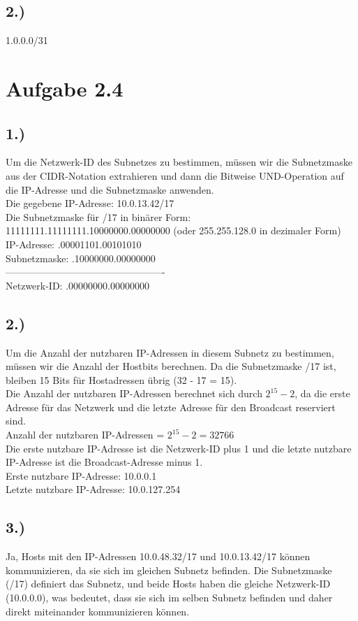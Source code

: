 \documentclass[a4paper]{scrartcl}
\begin{document}
\subsection*{2.)}
1.0.0.0/31

\section*{Aufgabe 2.4}
\subsection*{1.)}
Um die Netzwerk-ID des Subnetzes zu bestimmen, müssen wir die Subnetzmaske aus der CIDR-Notation extrahieren und dann die Bitweise UND-Operation auf die IP-Adresse und die Subnetzmaske anwenden. \\
Die gegebene IP-Adresse: 10.0.13.42/17\\
Die Subnetzmaske für /17 in binärer Form: 11111111.11111111.10000000.00000000 (oder 255.255.128.0 in dezimaler Form)\\
IP-Adresse:  .00001101.00101010 \\
Subnetzmaske: .10000000.00000000 \\
-------------------------------------------------   \\
Netzwerk-ID:   .00000000.00000000

\subsection*{2.)}
Um die Anzahl der nutzbaren IP-Adressen in diesem Subnetz zu bestimmen, müssen wir die Anzahl der Hostbits berechnen. Da die Subnetzmaske /17 ist, bleiben 15 Bits für Hostadressen übrig (32 - 17 = 15).\\
Die Anzahl der nutzbaren IP-Adressen berechnet sich durch $2^{15} -2$, da die erste Adresse für das Netzwerk und die letzte Adresse für den Broadcast reserviert sind.\\
Anzahl der nutzbaren IP-Adressen = $2^{15} - 2 = 32766$ \\
Die erste nutzbare IP-Adresse ist die Netzwerk-ID plus 1 und die letzte nutzbare IP-Adresse ist die Broadcast-Adresse minus 1.\\
Erste nutzbare IP-Adresse: 10.0.0.1\\
Letzte nutzbare IP-Adresse: 10.0.127.254
\subsection*{3.)}
Ja, Hosts mit den IP-Adressen 10.0.48.32/17 und 10.0.13.42/17 können kommunizieren, da sie sich im gleichen Subnetz befinden. Die Subnetzmaske (/17) definiert das Subnetz, und beide Hosts haben die gleiche Netzwerk-ID (10.0.0.0), was bedeutet, dass sie sich im selben Subnetz befinden und daher direkt miteinander kommunizieren können.
\end{document}
